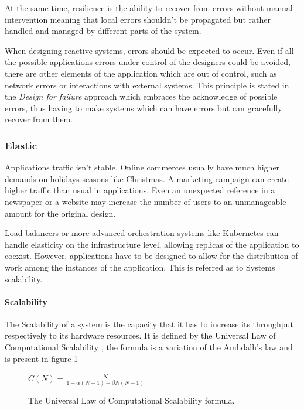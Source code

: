 \documentclass[../main.tex]{subfiles}
\begin{document}
At the same time, resilience is the ability to recover from errors without manual
intervention meaning that local errors shouldn't be propagated but rather handled and
managed by different parts of the system.

When designing reactive systems, errors should be expected to occur. Even if all
the possible applications errors under control of the designers could be avoided, there
are other elements of the application which are out of control, such as network
errors or interactions with external systems. This principle is stated in the
\textit{Design for failure} approach \autocite{Sussna2015DesigningDelivery} which embraces the
acknowledge of possible errors, thus having to make systems which can have
errors but can gracefully recover from them.

\subsubsection{Elastic}

Applications traffic isn't stable. Online commerces usually have much higher
demands on holidays seasons like Christmas. A marketing campaign can create
higher traffic than usual in applications. Even an unexpected reference in a
newspaper or a website may increase the number of users to an unmanageable
amount for the original design.

Load balancers or more advanced orchestration systems like Kubernetes
\cite{Production-GradeKubernetes} can handle elasticity on the infrastructure
level, allowing replicas of the application to coexist. However, applications
have to be designed to allow for the distribution of work among the instances of the
application. This is referred as to Systems scalability.

\paragraph{Scalability}

The Scalability of a system is the capacity that it has to increase its
throughput respectively to its hardware resources. It is defined by the
Universal Law of Computational Scalability \autocite{Gunther2008AFunctions}, the formula
is a variation of the Amhdalh's law \autocite{Rodgers1985ImprovementsDesign} and is present in figure \ref{fig:scalability}

\begin{figure}[ht] \centering
  $C(N)={\frac {N}{1+\alpha (N-1)+\beta N(N-1)}}$
  \caption{The Universal Law of Computational Scalability formula.}
  \label{fig:scalability}
\end{figure}
\end{document}
